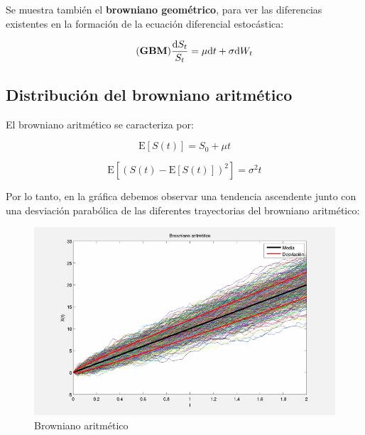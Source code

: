 \documentclass[a4paper,11pt]{article}
\begin{document}
Se muestra tambi\'en el \textbf{browniano geom\'etrico}, para ver las diferencias
existentes en la formaci\'on de la ecuaci\'on diferencial estoc\'astica:

\begin{equation*}
   \tag{\textbf{GBM}}
   \frac{\mathrm{d}S_t}{S_t} = \mu\mathrm{d}t + \sigma\mathrm{d}W_t
\end{equation*}

\subsection{Distribuci\'on del browniano aritm\'etico}

El browniano aritm\'etico se caracteriza por:

\begin{equation*}
   \tag{Media}
   \mathrm{E}[S(t)] = S_0 + \mu t
\end{equation*}

\begin{equation*}
   \tag{Varianza}
   \mathrm{E}[(S(t) - \mathrm{E}[S(t)])^2] = \sigma^2 t
\end{equation*}

Por lo tanto, en la gr\'afica debemos observar una tendencia ascendente junto con
una desviaci\'on parab\'olica de las diferentes trayectorias del browniano
aritm\'etico:\\

\begin{figure}[htb]
   \begin{center}
      \includegraphics[scale=0.5,
      keepaspectratio]{./figures/ABM.png}
   \end{center}
   \caption{Browniano aritm\'etico}
\end{figure}
\end{document}
